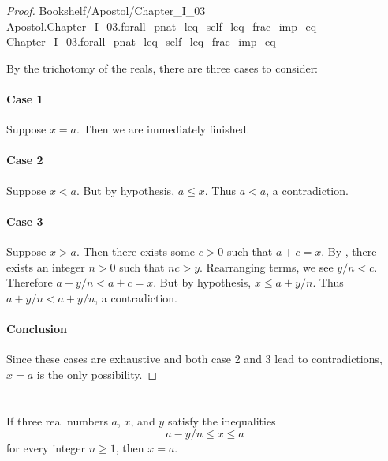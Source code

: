 \documentclass{article}
\newcommand{\link}[1]{\lean{../..}
  {Bookshelf/Apostol/Chapter\_I\_03} %
  {Apostol.Chapter\_I\_03.#1} %
  {Chapter\_I\_03.#1} %
}
\begin{document}
\begin{proof}

  \link{forall\_pnat\_leq\_self\_leq\_frac\_imp\_eq}

  \divider

  By the trichotomy of the reals, there are three cases to consider:

  \paragraph{Case 1}%

    Suppose $x = a$.
    Then we are immediately finished.

  \paragraph{Case 2}%

    Suppose $x < a$.
    But by hypothesis, $a \leq x$.
    Thus $a < a$, a contradiction.

  \paragraph{Case 3}%

    Suppose $x > a$.
    Then there exists some $c > 0$ such that $a + c = x$.
    By , there exists an integer $n > 0$ such that
      $nc > y$.
    Rearranging terms, we see $y / n < c$.
    Therefore $a + y / n < a + c = x$.
    But by hypothesis, $x \leq a + y / n$.
    Thus $a + y / n < a + y / n$, a contradiction.

  \paragraph{Conclusion}%

    Since these cases are exhaustive and both case 2 and 3 lead to
      contradictions, $x = a$ is the only possibility.

\end{proof}

\section*{}%
%

If three real numbers $a$, $x$, and $y$ satisfy the inequalities
  $$a - y / n \leq x \leq a$$ for every integer $n \geq 1$, then $x = a$.
\end{document}
